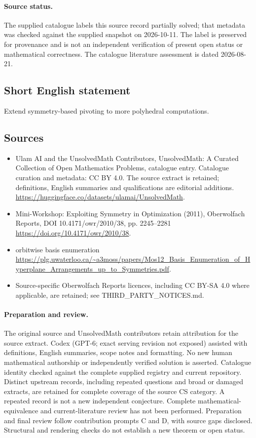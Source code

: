 \documentclass[11pt]{article}
\begin{document}
\paragraph{Source status.}
The supplied catalogue labels this source record partially solved; that metadata was checked against the supplied snapshot on 2026-10-11. The label is preserved for provenance and is not an independent verification of present open status or mathematical correctness. The catalogue literature assessment is dated 2026-08-21.
\subsection{Short English statement}
Extend symmetry-based pivoting to more polyhedral computations.
\subsection{Sources}
\begin{itemize}
\item[S1] Ulam AI and the UnsolvedMath Contributors, UnsolvedMath: A Curated Collection of Open Mathematics Problems, catalogue entry. Catalogue curation and metadata: CC BY 4.0. The source extract is retained; definitions, English summaries and qualifications are editorial additions.
\url{https://huggingface.co/datasets/ulamai/UnsolvedMath}.
\item[S2] Mini-Workshop: Exploiting Symmetry in Optimization (2011), Oberwolfach Reports, DOI 10.4171/owr/2010/38, pp. 2245--2281
\url{https://doi.org/10.4171/owr/2010/38}.
\item[S3] orbitwise basis enumeration
\url{https://plg.uwaterloo.ca/~a3moss/papers/Mos12_Basis_Enumeration_of_Hyperplane_Arrangements_up_to_Symmetries.pdf}.
\item Source-specific Oberwolfach Reports licences, including CC BY-SA 4.0 where applicable, are retained; see THIRD\_PARTY\_NOTICES.md.
\end{itemize}
\paragraph{Preparation and review.}
The original source and UnsolvedMath contributors retain attribution for the source extract. Codex (GPT-6; exact serving revision not exposed) assisted with definitions, English summaries, scope notes and formatting. No new human mathematical authorship or independently verified solution is asserted. Catalogue identity checked against the complete supplied registry and current repository. Distinct upstream records, including repeated questions and broad or damaged extracts, are retained for complete coverage of the source CS category. A repeated record is not a new independent conjecture. Complete mathematical-equivalence and current-literature review has not been performed. Preparation and final review follow contribution prompts C and D, with source gaps disclosed. Structural and rendering checks do not establish a new theorem or open status.
\label{end:statement}
\end{document}
